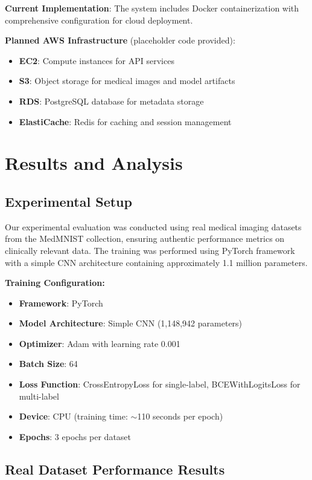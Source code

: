\documentclass[12pt,a4paper]{article}
\begin{document}
\textbf{Current Implementation}: The system includes Docker containerization with comprehensive configuration for cloud deployment.

\textbf{Planned AWS Infrastructure} (placeholder code provided):
\begin{itemize}
    \item \textbf{EC2}: Compute instances for API services
    \item \textbf{S3}: Object storage for medical images and model artifacts
    \item \textbf{RDS}: PostgreSQL database for metadata storage
    \item \textbf{ElastiCache}: Redis for caching and session management
\end{itemize}

\section{Results and Analysis}

\subsection{Experimental Setup}

Our experimental evaluation was conducted using real medical imaging datasets from the MedMNIST collection, ensuring authentic performance metrics on clinically relevant data. The training was performed using PyTorch framework with a simple CNN architecture containing approximately 1.1 million parameters.

\textbf{Training Configuration:}
\begin{itemize}
    \item \textbf{Framework}: PyTorch
    \item \textbf{Model Architecture}: Simple CNN (1,148,942 parameters)
    \item \textbf{Optimizer}: Adam with learning rate 0.001
    \item \textbf{Batch Size}: 64
    \item \textbf{Loss Function}: CrossEntropyLoss for single-label, BCEWithLogitsLoss for multi-label
    \item \textbf{Device}: CPU (training time: $\sim$110 seconds per epoch)
    \item \textbf{Epochs}: 3 epochs per dataset
\end{itemize}

\subsection{Real Dataset Performance Results}
\end{document}
